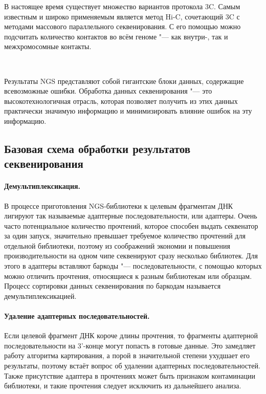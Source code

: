 \documentclass[a4paper,12pt]{article}
\begin{document}
В настоящее время существует множество вариантов протокола 3C.
Самым известным и широко применяемым является метод Hi-C, сочетающий 3C с методами массового параллельного секвенирования.
С его помощью можно подсчитать количество контактов во всём геноме "--- как внутри-, так и межхромосомные контакты\cite{Oluwadare_2019}.

~

Результаты NGS представляют собой гигантские блоки данных, содержащие всевозможные ошибки.
Обработка данных секвенирования "--- это высокотехнологичная отрасль, которая позволяет получить из этих данных практически значимую информацию и минимизировать влияние ошибок на эту информацию.

\subsection{Базовая схема обработки результатов секвенирования}

\paragraph{Демультиплексикация.}
В процессе приготовления NGS-библиотеки к целевым фрагментам ДНК лигируют так называемые адаптерные последовательности, или адаптеры.
Очень часто потенциальное количество прочтений, которое способен выдать секвенатор за один запуск, значительно превышает требуемое количество прочтений для отдельной библиотеки, поэтому из соображений экономии и повышения производительности на одном чипе секвенируют сразу несколько библиотек.
Для этого в адаптеры вставляют баркоды "--- последовательности, с помощью которых можно отличить прочтения, относящиеся к разным библиотекам или образцам.
Процесс сортировки данных секвенирования по баркодам называется демультиплексикацией.

\paragraph{Удаление адаптерных последовательностей.}
Если целевой фрагмент ДНК короче длины прочтения, то фрагменты адаптерной последовательности на 3'-конце могут попасть в готовые данные.
Это замедляет работу алгоритма картирования, а порой в значительной степени ухудшает его результаты, поэтому встаёт вопрос об удалении адаптерных последовательностей.
Также присутствие адаптера в прочтениях может быть признаком контаминации библиотеки, и такие прочтения следует исключить из дальнейшего анализа\cite{Martin_2011}.
\end{document}
